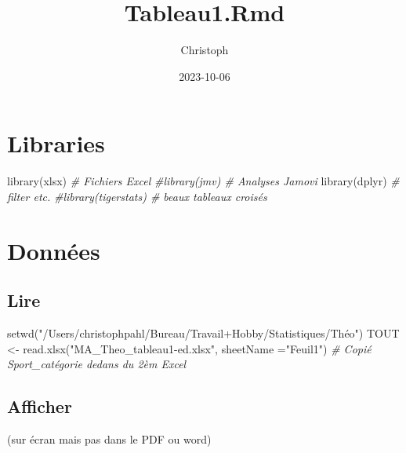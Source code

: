 \documentclass[
]{article}
\title{Tableau1.Rmd}
\author{Christoph}
\date{2023-10-06}
\newenvironment{Shaded}{\begin{snugshade}}{\end{snugshade}}
\newcommand{\AttributeTok}[1]{\textcolor[rgb]{0.77,0.63,0.00}{#1}}
\newcommand{\CommentTok}[1]{\textcolor[rgb]{0.56,0.35,0.01}{\textit{#1}}}
\newcommand{\FunctionTok}[1]{\textcolor[rgb]{0.00,0.00,0.00}{#1}}
\newcommand{\NormalTok}[1]{#1}
\newcommand{\OtherTok}[1]{\textcolor[rgb]{0.56,0.35,0.01}{#1}}
\newcommand{\StringTok}[1]{\textcolor[rgb]{0.31,0.60,0.02}{#1}}
\begin{document}
\maketitle

\hypertarget{libraries}{%
\section{Libraries}\label{libraries}}

\begin{Shaded}
\begin{Highlighting}[]
\FunctionTok{library}\NormalTok{(xlsx)                                         }\CommentTok{\# Fichiers Excel}
\CommentTok{\#library(jmv)                                          \# Analyses Jamovi}
\FunctionTok{library}\NormalTok{(dplyr)                                        }\CommentTok{\# filter etc.}
\CommentTok{\#library(tigerstats)                                   \# beaux tableaux croisés}
\end{Highlighting}
\end{Shaded}

\hypertarget{donnuxe9es}{%
\section{Données}\label{donnuxe9es}}

\hypertarget{lire}{%
\subsection{Lire}\label{lire}}

\begin{Shaded}
\begin{Highlighting}[]
\FunctionTok{setwd}\NormalTok{(}\StringTok{"/Users/christophpahl/Bureau/Travail+Hobby/Statistiques/Théo"}\NormalTok{)}
\NormalTok{TOUT }\OtherTok{\textless{}{-}} \FunctionTok{read.xlsx}\NormalTok{(}\StringTok{"MA\_Theo\_tableau1{-}ed.xlsx"}\NormalTok{, }\AttributeTok{sheetName =}\StringTok{"Feuil1"}\NormalTok{)    }\CommentTok{\# Copié Sport\_catégorie dedans du 2èm Excel}
\end{Highlighting}
\end{Shaded}

\hypertarget{afficher}{%
\subsection{Afficher}\label{afficher}}

(sur écran mais pas dans le PDF ou word)
\end{document}
